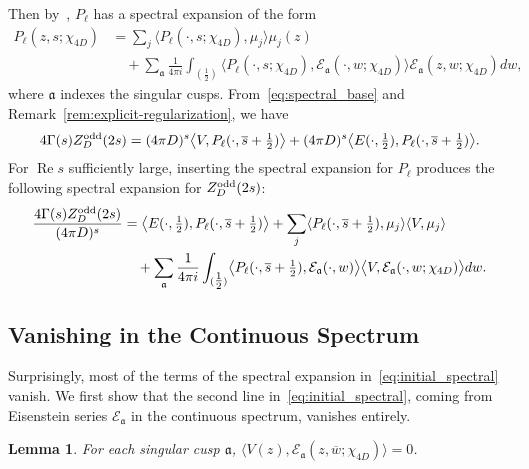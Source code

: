 \documentclass[11pt,reqno,oneside]{amsart}
\theoremstyle{plain}
\newtheorem{lemma}[theorem]{Lemma}
\theoremstyle{definition}
\renewcommand{\Re}{\operatorname{Re}}
\newcommand{\Zodd}{Z_D^{\textup{odd}}}
\newcommand{\chid}{\chi_{4D}}
\begin{document}
Then by~\cite[Prop.\ 4.1, 4.2]{dfi}, $P_\ell$ has a spectral expansion of the form
\begin{align}
  \label{eq:P4-spectral expansion}
  P_\ell(z, s; \chid)
   & =
  \sum_j
  \bigl\langle P_\ell(\cdot, s; \chid), \mu_j \bigr\rangle \mu_j(z)
  \\
   & \quad +
  \sum_{\mathfrak{a}} \frac{1}{4 \pi i}
  \int_{(\tfrac{1}{2})}
  \bigl\langle
  P_\ell(\cdot, s; \chid),
  \mathcal{E}_\mathfrak{a}(\cdot, w; \chid)
  \bigr\rangle
  \mathcal{E}_\mathfrak{a}(z, w; \chid) dw,
\end{align}
where $\mathfrak{a}$ indexes the singular cusps.
From~\eqref{eq:spectral_base} and Remark~\ref{rem:explicit-regularization}, we have
\begin{equation} \label{eq:regularized-expansion}
  4 \Gamma(s) \Zodd(2s)
  =
  (4 \pi D)^s \bigl\langle V, P_\ell(\cdot, \overline{s}+\tfrac{1}{2}) \bigr\rangle
  +
  (4 \pi D)^s \bigl\langle E(\cdot, \tfrac{1}{2}), P_\ell(\cdot, \overline{s}+\tfrac{1}{2}) \bigr\rangle.
\end{equation}
For $\Re s$ sufficiently large, inserting the spectral expansion for $P_\ell$
produces the following spectral expansion for $\Zodd(2s)$:
\begin{align}
  \label{eq:initial_spectral}
  \frac{4 \Gamma(s) \Zodd(2s)}{(4\pi D)^s}
   &
  =
  \bigl\langle E(\cdot, \tfrac{1}{2}), P_\ell(\cdot, \overline{s}+\tfrac{1}{2}) \bigr\rangle
  +
  \sum_j \langle P_\ell(\cdot, \overline{s}+\tfrac{1}{2}), \mu_j \rangle
  \langle V, \mu_j \rangle
  \\
   & \quad
  + \sum_{\mathfrak{a}} \frac{1}{4 \pi i}
  \int_{(\tfrac{1}{2})}
  \bigl\langle
  P_\ell(\cdot, \overline{s}+\tfrac{1}{2}),
  \mathcal{E}_\mathfrak{a}(\cdot, w)
  \bigr\rangle
  \bigl\langle
  V,
  \mathcal{E}_\mathfrak{a}(\cdot, w; \chid)
  \bigr\rangle
  dw.\notag{}
\end{align}


\subsection{Vanishing in the Continuous Spectrum}\label{ssec:cont}

Surprisingly, most of the terms of the spectral expansion
in~\eqref{eq:initial_spectral} vanish.
We first show that the second line in~\eqref{eq:initial_spectral}, coming from
Eisenstein series $\mathcal{E}_\mathfrak{a}$ in the continuous spectrum,
vanishes entirely.

\begin{lemma}\label{lemma:continuous_vanish}
  For each singular cusp $\mathfrak{a}$,
  $\langle V(z), \mathcal{E}_\mathfrak{a}(z,\overline{w}; \chid) \rangle = 0$.
\end{lemma}
\end{document}
